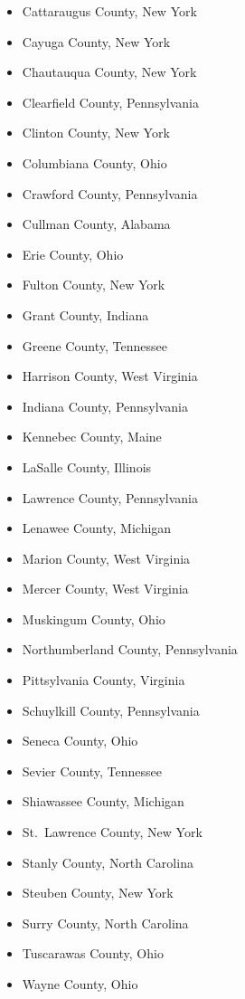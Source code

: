 \begin{itemize}
\tightlist
\item
  Cattaraugus County, New York
\item
  Cayuga County, New York
\item
  Chautauqua County, New York
\item
  Clearfield County, Pennsylvania
\item
  Clinton County, New York
\item
  Columbiana County, Ohio
\item
  Crawford County, Pennsylvania
\item
  Cullman County, Alabama
\item
  Erie County, Ohio
\item
  Fulton County, New York
\item
  Grant County, Indiana
\item
  Greene County, Tennessee
\item
  Harrison County, West Virginia
\item
  Indiana County, Pennsylvania
\item
  Kennebec County, Maine
\item
  LaSalle County, Illinois
\item
  Lawrence County, Pennsylvania
\item
  Lenawee County, Michigan
\item
  Marion County, West Virginia
\item
  Mercer County, West Virginia
\item
  Muskingum County, Ohio
\item
  Northumberland County, Pennsylvania
\item
  Pittsylvania County, Virginia
\item
  Schuylkill County, Pennsylvania
\item
  Seneca County, Ohio
\item
  Sevier County, Tennessee
\item
  Shiawassee County, Michigan
\item
  St.~Lawrence County, New York
\item
  Stanly County, North Carolina
\item
  Steuben County, New York
\item
  Surry County, North Carolina
\item
  Tuscarawas County, Ohio
\item
  Wayne County, Ohio
\end{itemize}

